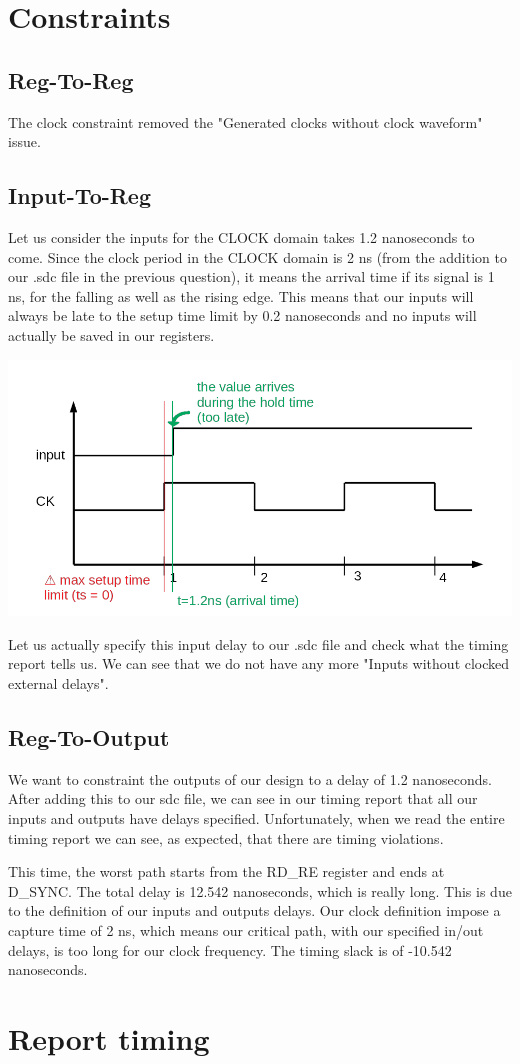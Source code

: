 \documentclass[a4paper]{article}
\begin{document}
\section{Constraints}
\subsection{Reg-To-Reg}
The clock constraint removed the "Generated clocks without clock waveform" issue.

\subsection{Input-To-Reg}
Let us consider the inputs for the CLOCK domain takes 1.2 nanoseconds to come. Since the clock period in the
CLOCK domain is 2 ns (from the addition to our .sdc file in the previous question), it means the arrival time
if its signal is 1 ns, for the falling as well as the rising edge. This means that our inputs will always be
late to the setup time limit by 0.2 nanoseconds and no inputs will actually be saved in our registers.

\begin{center}
  \includegraphics[width=14cm]{./timing_problem.png}
\end{center}

Let us actually specify this input delay to our .sdc file and check what the timing report tells us.
We can see that we do not have any more "Inputs without clocked external delays".

\subsection{Reg-To-Output}
We want to constraint the outputs of our design to a delay of 1.2 nanoseconds. After adding this to our sdc file,
we can see in our timing report that all our inputs and outputs have delays specified. Unfortunately, when we read
the entire timing report we can see, as expected, that there are timing violations.

This time, the worst path starts from the RD\_RE register and ends at D\_SYNC. The total delay is 12.542 nanoseconds,
which is really long. This is due to the definition of our inputs and outputs delays. Our clock definition impose a
capture time of 2 ns, which means our critical path, with our specified in/out delays, is too long for our clock
frequency. The timing slack is of -10.542 nanoseconds.

\section{Report timing}
\end{document}

